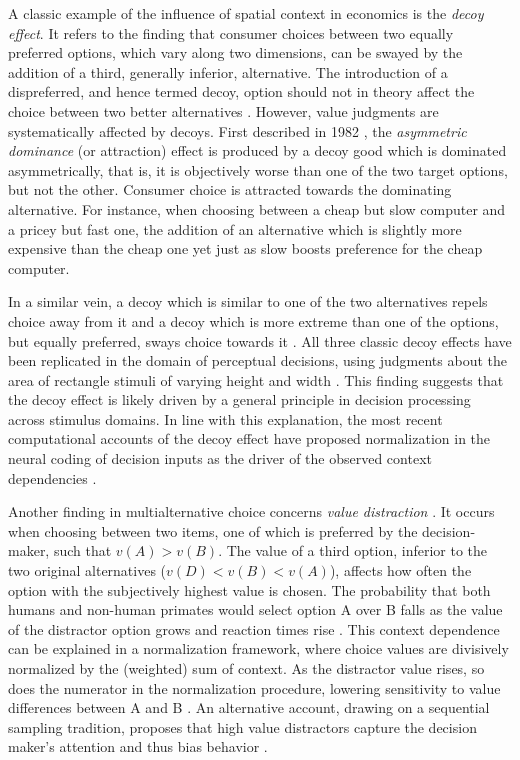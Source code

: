 \documentclass[a4paper, nobind]{templates/ociamthesis}
\begin{document}
A classic example of the influence of spatial context in economics is the \emph{decoy effect}. It refers to the finding that consumer choices between two equally preferred options, which vary along two dimensions, can be swayed by the addition of a third, generally inferior, alternative. The introduction of a dispreferred, and hence termed decoy, option should not in theory affect the choice between two better alternatives \autocite{block1960}. However, value judgments are systematically affected by decoys. First described in 1982 \autocite{huber1982}, the \emph{asymmetric dominance} (or attraction) effect is produced by a decoy good which is dominated asymmetrically, that is, it is objectively worse than one of the two target options, but not the other. Consumer choice is attracted towards the dominating alternative. For instance, when choosing between a cheap but slow computer and a pricey but fast one, the addition of an alternative which is slightly more expensive than the cheap one yet just as slow boosts preference for the cheap computer.

In a similar vein, a decoy which is similar to one of the two alternatives repels choice away from it \autocite[\emph{similarity effect}][]{tversky1972} and a decoy which is more extreme than one of the options, but equally preferred, sways choice towards it \autocite[\emph{compromise effect},][]{simonson1989}. All three classic decoy effects have been replicated in the domain of perceptual decisions, using judgments about the area of rectangle stimuli of varying height and width \autocite{trueblood2013}. This finding suggests that the decoy effect is likely driven by a general principle in decision processing across stimulus domains. In line with this explanation, the most recent computational accounts of the decoy effect have proposed normalization in the neural coding of decision inputs as the driver of the observed context dependencies \autocites[e.g.][]{rigoli2017,bushong2021,daviet2021,landry2021}.

Another finding in multialternative choice concerns \emph{value distraction} \autocite{louie2013}. It occurs when choosing between two items, one of which is preferred by the decision-maker, such that \(v(A)>v(B)\). The value of a third option, inferior to the two original alternatives (\(v(D)<v(B)<v(A)\)), affects how often the option with the subjectively highest value is chosen. The probability that both humans and non-human primates would select option A over B falls as the value of the distractor option grows \autocite[in speeded choices as in][]{louie2013} and reaction times rise \autocite[in slower settings in humans as in][]{gluth2020}. This context dependence can be explained in a normalization framework, where choice values are divisively normalized by the (weighted) sum of context. As the distractor value rises, so does the numerator in the normalization procedure, lowering sensitivity to value differences between A and B \autocite{louie2013}. An alternative account, drawing on a sequential sampling tradition, proposes that high value distractors capture the decision maker's attention and thus bias behavior \autocite{gluth2020}.
\end{document}
